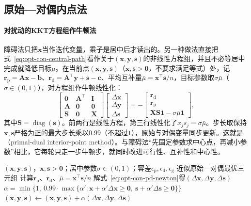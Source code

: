 \subsection{原始—对偶内点法}
\label{sec:opt-con-primal-dual-ipm}

\paragraph{对扰动的KKT方程组作牛顿法}
障碍法只把$\bm x$当作迭代变量，乘子是居中后才读出的。另一种做法直接把式~\eqref{eq:opt-con-central-path}看作关于$(\bm x,\bm y,\bm s)$的非线性方程组，并且不必等居中完成就降低目标$\mu$。在当前点$(\bm x,\bm y,\bm s)$（$\bm x,\bm s>\bm0$，不要求满足等式）处，记$\bm r_{\mathrm p}=\bm A\bm x-\bm b$、$\bm r_{\mathrm d}=\bm A^\top\bm y+\bm s-\bm c$、平均互补量$\bar\mu=\bm x^\top\bm s/n$，目标参数取$\sigma\bar\mu$（$\sigma\in(0,1)$），对方程组作牛顿线性化：
\begin{equation}
\label{eq:opt-con-pd-newton}
  \begin{bmatrix}\bm0&\bm A^\top&\bm I\\\bm A&\bm0&\bm0\\\bm S&\bm0&\bm X\end{bmatrix}
  \begin{bmatrix}\Delta\bm x\\\Delta\bm y\\\Delta\bm s\end{bmatrix}
  =-\begin{bmatrix}\bm r_{\mathrm d}\\\bm r_{\mathrm p}\\\bm X\bm S\bm1-\sigma\bar\mu\bm1\end{bmatrix},
\end{equation}
其中$\bm S=\operatorname{diag}(\bm s)$。前两行是线性方程，第三行线性化了$x_js_j=\sigma\bar\mu$。步长取保持$\bm x,\bm s$严格为正的最大步长乘以$0.99$（不超过$1$），原始与对偶变量同步更新。这就是（primal-dual interior-point method）。与障碍法“先固定参数求中心点，再减小参数”相比，它每轮只走一步牛顿步，就同时改进可行性、互补性和中心性。

\begin{algorithm}[原始—对偶路径跟踪]
\label{alg:opt-con-primal-dual}
\begin{algorithmic}[1]
\Require $(\bm x,\bm y,\bm s)$，$\bm x,\bm s>\bm0$；居中参数$\sigma\in(0,1)$；容差$\epsilon_{\mathrm p},\epsilon_{\mathrm d},\epsilon_{\mathrm g}$
\Ensure 近似原始—对偶最优三元组
\Repeat
  \State 计算$\bm r_{\mathrm p}$、$\bm r_{\mathrm d}$、$\bar\mu=\bm x^\top\bm s/n$
  \State 解式~\eqref{eq:opt-con-pd-newton}得$(\Delta\bm x,\Delta\bm y,\Delta\bm s)$
  \State $\alpha=\min\{1,\ 0.99\cdot\max\{\alpha':\bm x+\alpha'\Delta\bm x\geq\bm0,\ \bm s+\alpha'\Delta\bm s\geq\bm0\}\}$
  \State $(\bm x,\bm y,\bm s)\leftarrow(\bm x,\bm y,\bm s)+\alpha(\Delta\bm x,\Delta\bm y,\Delta\bm s)$
\end{algorithmic}
\end{algorithm}

